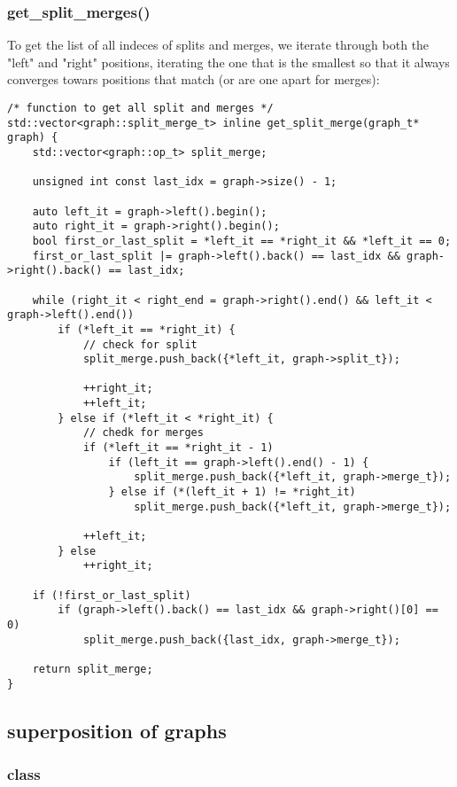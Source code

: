 \documentclass[11pt]{article}
\begin{document}
\subsubsection{get\_split\_merges()}

To get the list of all indeces of splits and merges, we iterate through both the "left" and "right" positions, iterating the one that is the smallest so that it always converges towars positions that match (or are one apart for merges):

\begin{lstlisting}[style=CStyle]
/* function to get all split and merges */
std::vector<graph::split_merge_t> inline get_split_merge(graph_t* graph) {
	std::vector<graph::op_t> split_merge;

	unsigned int const last_idx = graph->size() - 1;

	auto left_it = graph->left().begin();
	auto right_it = graph->right().begin();
	bool first_or_last_split = *left_it == *right_it && *left_it == 0;
	first_or_last_split |= graph->left().back() == last_idx && graph->right().back() == last_idx;

	while (right_it < right_end = graph->right().end() && left_it < graph->left().end())
		if (*left_it == *right_it) {
			// check for split
			split_merge.push_back({*left_it, graph->split_t});

			++right_it;
			++left_it;
		} else if (*left_it < *right_it) {
			// chedk for merges
			if (*left_it == *right_it - 1)
				if (left_it == graph->left().end() - 1) {
					split_merge.push_back({*left_it, graph->merge_t});
				} else if (*(left_it + 1) != *right_it)
					split_merge.push_back({*left_it, graph->merge_t});

			++left_it;
		} else
			++right_it;
		
	if (!first_or_last_split)
		if (graph->left().back() == last_idx && graph->right()[0] == 0)
			split_merge.push_back({last_idx, graph->merge_t});

	return split_merge;
}
\end{lstlisting}

\subsection{superposition of graphs}

\subsubsection{class}
\end{document}
